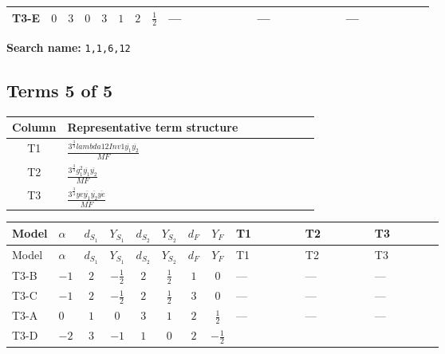 \documentclass[8pt]{article}
\begin{document}
\begin{landscape}
\begin{longtable}{@{}llcccccc >{\raggedright\arraybackslash}p{0.21\linewidth} >{\raggedright\arraybackslash}p{0.21\linewidth} >{\raggedright\arraybackslash}p{0.21\linewidth}@{}}
\midrule
T3-E & $0$ & $3$ & $0$ & $3$ & $1$ & $2$ & $\frac{1}{2}$ & --- & --- & --- \\
\midrule
\bottomrule
\end{longtable}
\clearpage
\noindent\textbf{Search name: }\texttt{1,1,6,12}\par\smallskip
\subsection*{Terms 5 of 5}
\begin{center}
\begin{tabular}{@{}c >{\raggedright\arraybackslash}p{0.82\linewidth}@{}}
\toprule
Column & Representative term structure \\
\midrule
T1 & \(\displaystyle \frac{3^{\frac{3}{4}} lambda12Inv1 \overline{y_{1}} \overline{y_{2}}}{MF}\) \\
\midrule
T2 & \(\displaystyle \frac{3^{\frac{3}{4}} g_{1}^{2} \overline{y_{1}} \overline{y_{2}}}{MF}\) \\
\midrule
T3 & \(\displaystyle \frac{3^{\frac{3}{4}} ye \overline{y_{1}} \overline{y_{2}} \overline{ye}}{MF}\) \\
\midrule
\bottomrule
\end{tabular}
\end{center}
\smallskip
\tiny
\begin{longtable}{@{}llcccccc >{\raggedright\arraybackslash}p{0.21\linewidth} >{\raggedright\arraybackslash}p{0.21\linewidth} >{\raggedright\arraybackslash}p{0.21\linewidth}@{}}
\toprule
Model & $\alpha$ & $d_{S_1}$ & $Y_{S_1}$ & $d_{S_2}$ & $Y_{S_2}$ & $d_F$ & $Y_F$ & T1 & T2 & T3 \\
\midrule
\endfirsthead
\toprule
Model & $\alpha$ & $d_{S_1}$ & $Y_{S_1}$ & $d_{S_2}$ & $Y_{S_2}$ & $d_F$ & $Y_F$ & T1 & T2 & T3 \\
\midrule
\endhead
T3-B & $-1$ & $2$ & $-\frac{1}{2}$ & $2$ & $\frac{1}{2}$ & $1$ & $0$ & --- & --- & --- \\
\midrule
T3-C & $-1$ & $2$ & $-\frac{1}{2}$ & $2$ & $\frac{1}{2}$ & $3$ & $0$ & --- & --- & --- \\
\midrule
T3-A & $0$ & $1$ & $0$ & $3$ & $1$ & $2$ & $\frac{1}{2}$ & --- & --- & --- \\
\midrule
T3-D & $-2$ & $3$ & $-1$ & $1$ & $0$ & $2$ & $-\frac{1}{2}$ & \scriptsize\adjustbox{max width=\linewidth}{$\begin{gathered} - \frac{3^{\frac{3}{4}} lambda12Inv1 \overline{y_{1}} \overline{y_{2}}}{6 MF}\end{gathered}$} & \scriptsize\adjustbox{max width=\linewidth}{$\begin{gathered} - \frac{3^{\frac{3}{4}} g_{1}^{2} \overline{y_{1}} \overline{y_{2}}}{8 MF}\end{gathered}$} & \scriptsize\adjustbox{max width=\linewidth}{$\begin{gathered} \frac{3^{\frac{3}{4}} ye \overline{y_{1}} \overline{y_{2}} \overline{ye}}{12 MF}\end{gathered}$} \\

\end{longtable}
\end{landscape}
\end{document}

